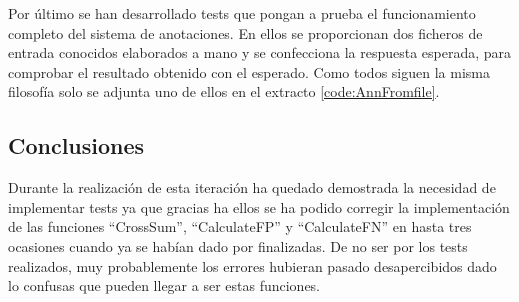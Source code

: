     Por último se han desarrollado tests que pongan a prueba el funcionamiento completo del sistema de anotaciones. En ellos se proporcionan dos ficheros de entrada conocidos elaborados a mano y se confecciona la respuesta esperada, para comprobar el resultado obtenido con el esperado. Como todos siguen la misma filosofía solo se adjunta uno de ellos en el extracto \ref{code:AnnFromfile}.
    
    
    \subsection{Conclusiones}
    
    Durante la realización de esta iteración ha quedado demostrada la necesidad de implementar tests ya que gracias ha ellos se ha podido corregir la implementación de las funciones ``CrossSum'', ``CalculateFP'' y ``CalculateFN'' en hasta tres ocasiones cuando ya se habían dado por finalizadas. De no ser por los tests realizados, muy probablemente los errores hubieran pasado desapercibidos dado lo confusas que pueden llegar a ser estas funciones.